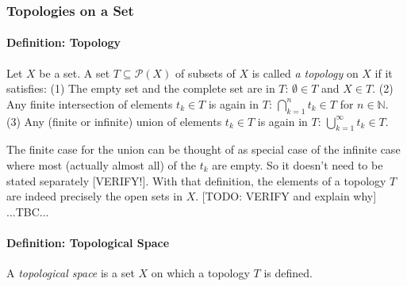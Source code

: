 





\subsubsection{Topologies on a Set}


\paragraph{Definition: Topology} 
Let $X$ be a set. A set $T \subseteq \mathcal{P}(X)$ of subsets of $X$ is called \emph{a topology} on $X$ if it satisfies: (1) The empty set and the complete set are in $T$: $\emptyset \in T$ and $X \in T$. (2) Any finite intersection of elements $t_k \in T$ is again in $T$: $\bigcap_{k=1}^n t_k \in T$ for $n \in \mathbb{N}$. (3) Any (finite or infinite) union of elements $t_k \in T$ is again in $T$: $\bigcup_{k=1}^\infty t_k \in T$. 

\medskip
The finite case for the union can be thought of as special case of the infinite case where most (actually almost all) of the $t_k$ are empty. So it doesn't need to be stated separately [VERIFY!]. With that definition, the elements of a topology $T$ are indeed precisely the open sets in $X$. [TODO: VERIFY and explain why] ...TBC...

\paragraph{Definition: Topological Space} A \emph{topological space} is a set $X$ on which a topology $T$ is defined.


